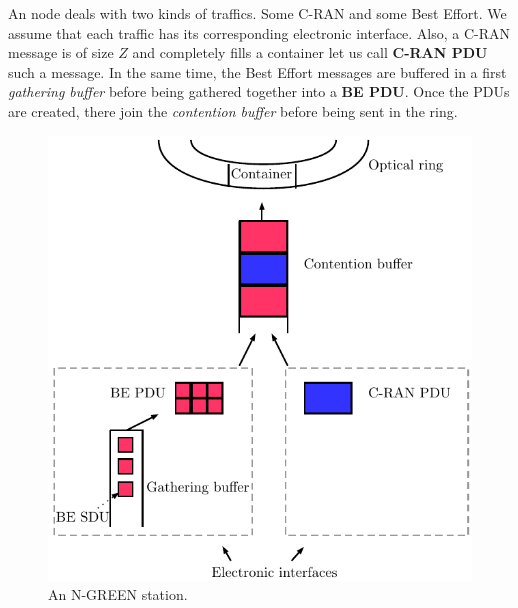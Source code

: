 \documentclass[]{algotel}
\begin{document}
  
      An node deals with two kinds of traffics. Some C-RAN and some Best Effort. We assume that each traffic has its corresponding electronic interface. Also, a C-RAN message is of size $Z$ and completely fills a container let us call {\bf C-RAN PDU} such a message. In the same time, the Best Effort messages are buffered in a first {\em gathering buffer} before being gathered together into a {\bf BE PDU}. Once the PDUs are created, there join the {\em contention buffer} before being sent in the ring.  
      \begin{figure}[h!]
\begin{center}   
  \includegraphics[scale=0.7]{buffers.pdf}
     \caption{An N-GREEN station.}
     
\end{center}
  \end{figure}
 
   
%    
%   
\end{document}
